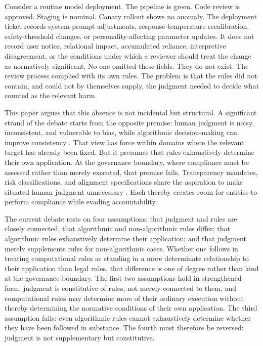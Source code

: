 \documentclass[11pt,a4paper]{article}
\begin{document}
Consider a routine model deployment. The pipeline is green. Code review is approved. Staging is nominal. Canary rollout shows no anomaly. The deployment ticket records system-prompt adjustments, response-temperature recalibration, safety-threshold changes, or personality-affecting parameter updates. It does not record user notice, relational impact, accumulated reliance, interpretive disagreement, or the conditions under which a reviewer should treat the change as normatively significant. No one omitted these fields. They do not exist. The review process complied with its own rules. The problem is that the rules did not contain, and could not by themselves supply, the judgment needed to decide what counted as the relevant harm.

This paper argues that this absence is not incidental but structural. A significant strand of the debate starts from the opposite premise: human judgment is noisy, inconsistent, and vulnerable to bias, while algorithmic decision-making can improve consistency \citep{kahneman2021noise}. That view has force within domains where the relevant target has already been fixed. But it presumes that rules exhaustively determine their own application. At the governance boundary, where compliance must be assessed rather than merely executed, that premise fails. Transparency mandates, risk classifications, and alignment specifications share the aspiration to make situated human judgment unnecessary \citep{ananny2018seeing}. Each thereby creates room for entities to perform compliance while evading accountability.

The current debate rests on four assumptions: that judgment and rules are closely connected; that algorithmic and non-algorithmic rules differ; that algorithmic rules exhaustively determine their application; and that judgment merely supplements rules for non-algorithmic cases. Whether one follows \citet{gori2024legal} in treating computational rules as standing in a more determinate relationship to their application than legal rules, that difference is one of degree rather than kind at the governance boundary. The first two assumptions hold in strengthened form: judgment is constitutive of rules, not merely connected to them, and computational rules may determine more of their ordinary execution without thereby determining the normative conditions of their own application. The third assumption fails: even algorithmic rules cannot exhaustively determine whether they have been followed in substance. The fourth must therefore be reversed: judgment is not supplementary but constitutive.
\end{document}
